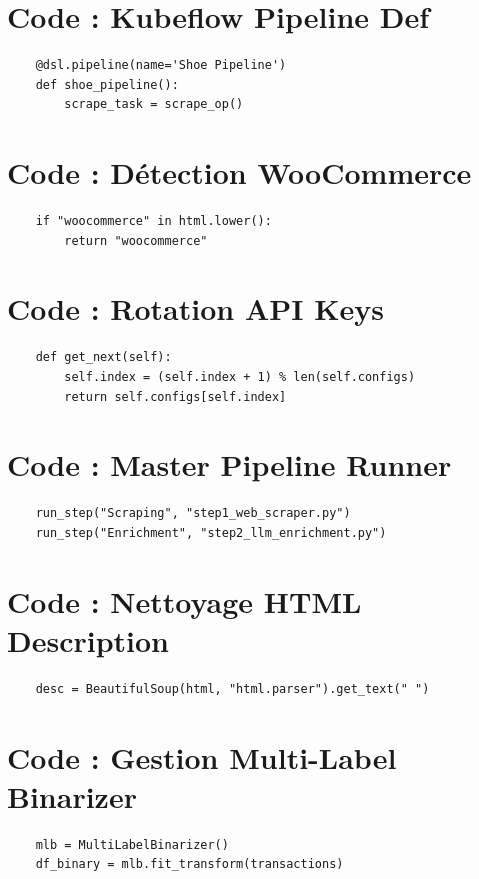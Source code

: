 \documentclass[11pt,a4paper,oneside]{report}
\begin{document}
    \section{Code : Kubeflow Pipeline Def}
    \begin{lstlisting}
    @dsl.pipeline(name='Shoe Pipeline')
    def shoe_pipeline():
        scrape_task = scrape_op()
    \end{lstlisting}

    \section{Code : Détection WooCommerce}
    \begin{lstlisting}
    if "woocommerce" in html.lower():
        return "woocommerce"
    \end{lstlisting}

    \section{Code : Rotation API Keys}
    \begin{lstlisting}
    def get_next(self):
        self.index = (self.index + 1) % len(self.configs)
        return self.configs[self.index]
    \end{lstlisting}

    \section{Code : Master Pipeline Runner}
    \begin{lstlisting}
    run_step("Scraping", "step1_web_scraper.py")
    run_step("Enrichment", "step2_llm_enrichment.py")
    \end{lstlisting}

    \section{Code : Nettoyage HTML Description}
    \begin{lstlisting}
    desc = BeautifulSoup(html, "html.parser").get_text(" ")
    \end{lstlisting}

    \section{Code : Gestion Multi-Label Binarizer}
    \begin{lstlisting}
    mlb = MultiLabelBinarizer()
    df_binary = mlb.fit_transform(transactions)
    \end{lstlisting}
\end{document}
